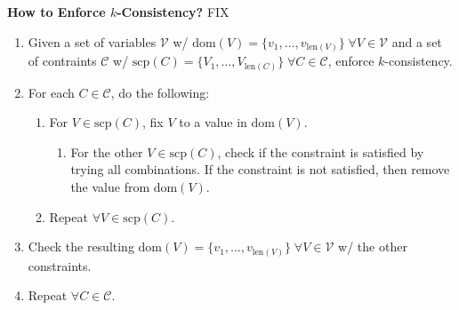 \begin{process} \textbf{How to Enforce $k$-Consistency?} FIX
    \begin{enumerate}
        \item Given a set of variables $\mathcal{V}$ w/ $\text{dom}(V) = \{v_1,\ldots,v_{\text{len}(V)}\} \; \forall V \in \mathcal{V}$ and a set of contraints $\mathcal{C}$ w/ $\text{scp}(C) = \{V_1,\ldots,V_{\text{len}(C)}\} \; \forall C \in \mathcal{C}$, enforce $k$-consistency.
        \item For each $C \in \mathcal{C}$, do the following:
        \begin{enumerate}
            \item For $V \in \text{scp}(C)$, fix $V$ to a value in $\text{dom}(V)$.
            \begin{enumerate}
                \item For the other $V \in \text{scp}(C)$, check if the constraint is satisfied by trying all combinations. If the constraint is not satisfied, then remove the value from $\text{dom}(V)$.
            \end{enumerate}
            \item Repeat $\forall V \in \text{scp}(C)$.
        \end{enumerate}
        \item Check the resulting $\text{dom}(V) = \{v_1,\ldots,v_{\text{len}(V)}\} \; \forall V \in \mathcal{V}$ w/ the other constraints.
        \item Repeat $\forall C \in \mathcal{C}$. 
    \end{enumerate}
\end{process}

\begin{example}
\end{example}
\newpage




